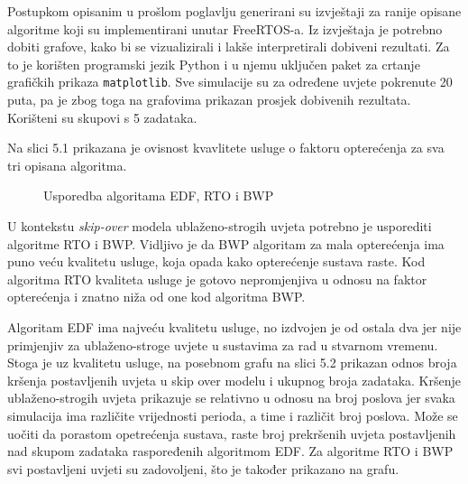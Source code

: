 \documentclass[../zavrsni.tex]{subfiles}
\begin{document}
\sloppy

\justifying

Postupkom opisanim u prošlom poglavlju generirani su izvještaji za ranije opisane algoritme koji su implementirani unutar FreeRTOS-a.
Iz izvještaja je potrebno dobiti grafove, kako bi se vizualizirali i lakše interpretirali dobiveni rezultati. 
Za to je korišten programski jezik Python i u njemu uključen paket za crtanje grafičkih prikaza \texttt{matplotlib}. 
Sve simulacije su za određene uvjete pokrenute 20 puta, pa je zbog toga na grafovima prikazan prosjek dobivenih rezultata. 
Korišteni su skupovi s 5 zadataka. 

Na slici 5.1 prikazana je ovisnost kvavlitete usluge o faktoru opterećenja za sva tri opisana algoritma.

\begin{figure}[!htb]
    \caption{\label{fig:my-label} Usporedba algoritama EDF, RTO i BWP}
\end{figure}

U kontekstu \textit{skip-over} modela ublaženo-strogih uvjeta potrebno je usporediti algoritme RTO i BWP. 
Vidljivo je da BWP algoritam za mala 
opterećenja ima puno veću kvalitetu usluge, koja opada kako opterećenje sustava raste. Kod algoritma RTO kvaliteta usluge je gotovo nepromjenjiva
u odnosu na faktor opterećenja i znatno niža od one kod algoritma BWP. 

Algoritam EDF ima najveću kvalitetu usluge, no izdvojen je od ostala dva jer nije primjenjiv za ublaženo-stroge
uvjete u sustavima za rad u stvarnom vremenu. Stoga je uz kvalitetu usluge, na posebnom grafu na slici 5.2 prikazan odnos broja kršenja 
postavljenih uvjeta u skip over modelu i ukupnog broja zadataka. Kršenje ublaženo-strogih uvjeta prikazuje se relativno u odnosu na broj 
poslova jer svaka simulacija ima različite vrijednosti perioda, a time i različit broj poslova.
Može se uočiti da porastom opetrećenja sustava, raste broj prekršenih uvjeta postavljenih nad skupom zadataka raspoređenih algoritmom EDF.
Za algoritme RTO i BWP svi postavljeni uvjeti su zadovoljeni, što je također prikazano na grafu.
\end{document}
